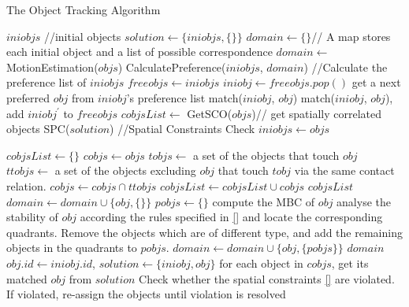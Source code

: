 \documentclass[letterpaper]{article}
\begin{document}
\begin{algorithm}[!]
\caption{The Object Tracking Algorithm}\label{algo}
\begin{algorithmic}[1]
\State $iniobjs$ //initial objects
\State $solution \leftarrow \{iniobjs, \{\}\}$
\State $domain \leftarrow \{\}$// A map stores each initial object and a list of possible correspondence 
\State $domain \leftarrow$ MotionEstimation($objs$) 
\State CalculatePreference($iniobjs$, $domain$) //Calculate the preference list of $iniobjs$
\State $freeobjs \leftarrow iniobjs$
\State $iniobj \leftarrow freeobjs.pop()$
\State get a next preferred $obj$ from $iniobj$'s preference list  
  \State match($iniobj$, $obj$)
  \State match($iniobj$, $obj$), add $iniobj^{\prime}$ to $freeobjs$
\EndIf 
\EndIf
\EndWhile
\State $cobjsList \leftarrow$ GetSCO($objs$)// get spatially correlated objects
\State SPC($solution$) //Spatial Constraints Check
\State $iniobjs \leftarrow objs$
\EndProcedure

\State $cobjsList \leftarrow \{\}$
\State $cobjs \leftarrow objs$ 
\State $tobjs \leftarrow$ a set of the objects that touch $obj$
\State $ttobjs \leftarrow$ a set of the objects excluding $obj$ that touch $tobj$ via the same contact relation.
\State $cobjs \leftarrow cobjs \cap ttobjs$
\EndFor
\State $cobjsList \leftarrow cobjsList \cup cobjs$
\EndFor
\Return $cobjsList$
\EndProcedure
{}
\State $domain \leftarrow domain \cup \{obj, \{\}\}$
\State $pobjs \leftarrow \{\}$
\State compute the MBC of $obj$
\State analyse the stability of $obj$ according the rules specified in \ref{} and locate the corresponding quadrants.
\State Remove the objects which are of different type, and add the remaining objects in the quadrants to $pobjs$. 
\State $domain \leftarrow domain \cup \{obj, \{pobjs\}\}$
\EndFor
\Return $domain$
\EndProcedure
{}
\State $obj.id \leftarrow iniobj.id$, $solution \leftarrow \{iniobj, obj\}$
\EndProcedure
{}
\State for each object in $cobjs$, get its matched $obj$ from $solution$
\State Check whether the spatial constraints \ref{} are violated. If violated, re-assign the objects until violation is resolved  
\EndFor
\EndProcedure
\end{algorithmic}
\end{algorithm}
 
\end{document}
